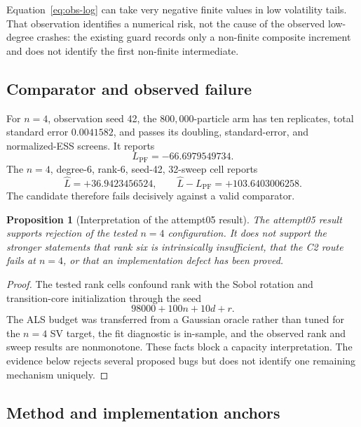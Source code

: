 \documentclass[11pt]{article}
\newtheorem{proposition}{Proposition}
\begin{document}
Equation~\eqref{eq:obs-log} can take very negative finite values in low
volatility tails. That observation identifies a numerical risk, not the cause
of the observed low-degree crashes: the existing guard records only a
non-finite composite increment and does not identify the first non-finite
intermediate.

\subsection{Comparator and observed failure}

For $n=4$, observation seed 42, the $800{,}000$-particle arm has ten
replicates, total standard error $0.0041582$, and passes its doubling,
standard-error, and normalized-ESS screens. It reports
\begin{equation}
L_{\mathrm{PF}}=-66.6979549734.
\end{equation}
The $n=4$, degree-6, rank-6, seed-42, 32-sweep cell reports
\begin{equation}
\widehat L=+36.9423456524,
\qquad
\widehat L-L_{\mathrm{PF}}=+103.6403006258.
\end{equation}
The candidate therefore fails decisively against a valid comparator.

\begin{proposition}[Interpretation of the attempt05 result]\label{prop:decision}
The attempt05 result supports rejection of the tested $n=4$ configuration.
It does not support the stronger statements that rank six is intrinsically
insufficient, that the C2 route fails at $n=4$, or that an implementation
defect has been proved.
\end{proposition}

\begin{proof}
The tested rank cells confound rank with the Sobol rotation and transition-core
initialization through the seed
\[
98000+100n+10d+r.
\]
The ALS budget was transferred from a Gaussian oracle rather than tuned for
the $n=4$ SV target, the fit diagnostic is in-sample, and the observed rank and
sweep results are nonmonotone. These facts block a capacity interpretation.
The evidence below rejects several proposed bugs but does not identify one
remaining mechanism uniquely.
\end{proof}

\subsection{Method and implementation anchors}
\end{document}
